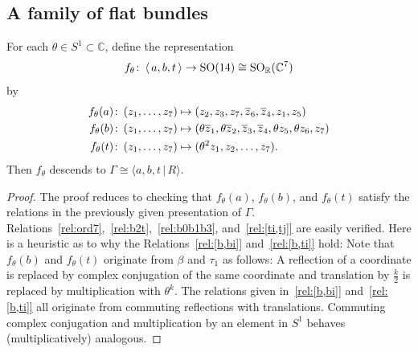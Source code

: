\documentclass[11pt,a4paper]{scrartcl}
\newcommand{\col}{\colon \thinspace}
\newcommand{\SO}{\textup{SO}}
\numberwithin{equation}{section}
\theoremstyle{plain}
\theoremstyle{definition}
\theoremstyle{remark}
\begin{document}
\subsection{A family of flat bundles}

\begin{proposition}\label{prop:example18-definition-monodromy-representation}
For each $\theta \in S^1 \subset \mathbb{C}$, define the representation \[f_\theta \col \langle\, a,b,t \, \rangle \to \SO(14)\cong \SO_{\mathbb{R}}(\mathbb{C}^7)\] by 
\begin{align*}
f_\theta(a) \col (z_1,\dots,z_7) &\mapsto (z_2,z_3,z_7,\overline{z}_6,\overline{z}_4,z_1,z_5) \\
f_\theta(b) \col (z_1,\dots,z_7) &\mapsto (\theta \overline{z}_1,\theta \overline{z}_2, \overline{z}_3, \overline{z}_4, \theta z_5, \theta z_6, z_7) \\
f_\theta(t) \col (z_1,\dots,z_7) &\mapsto (\theta^2 z_1,z_2, \dots, z_7).
\end{align*}
Then $f_\theta$ descends to $\Gamma \cong \langle a,b,t \, \vert \, R \rangle$.
\end{proposition}
\begin{proof}
The proof reduces to checking that $f_\theta(a)$, $f_\theta(b)$, and $f_\theta(t)$ satisfy the relations in the previously given presentation of $\Gamma$. Relations~\ref{rel:ord7},~\ref{rel:b2t},~\ref{rel:b0b1b3}, and~\ref{rel:[ti,tj]} are easily verified. Here is a heuristic as to why the Relations~\ref{rel:[b,bi]} and~\ref{rel:[b,ti]} hold: Note that $f_\theta(b)$ and $f_\theta(t)$ originate from $\beta$ and $\tau_1$ as follows: A reflection of a coordinate is replaced by complex conjugation of the same coordinate and translation by $\frac{k}{2}$ is replaced by multiplication with $\theta^k$. The relations given in~\ref{rel:[b,bi]} and~\ref{rel:[b,ti]} all originate from commuting reflections with translations. Commuting complex conjugation and multiplication by an element in $S^1$ behaves (multiplicatively) analogous. 
\end{proof}
\end{document}
